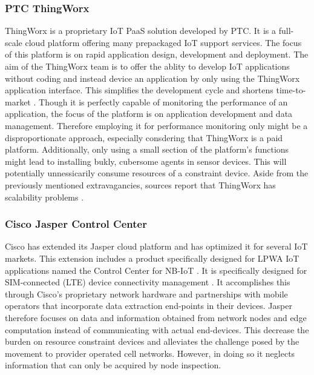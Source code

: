 \subsubsection*{PTC ThingWorx \cite{website:thingworx}}
ThingWorx is a proprietary IoT PaaS solution developed by PTC. It is a full-scale cloud platform offering many prepackaged IoT support services. The focus of this platform is on rapid application design, development and deployment. The aim of the ThingWorx team is to offer the ablity to develop IoT applications without coding and instead device an application by only using the ThingWorx application interface. This simplifies the development cycle and shortens time-to-market \cite{study_of_various}. Though it is perfectly capable of monitoring the performance of an application, the focus of the platform is on application development and data management. Therefore employing it for performance monitoring only might be a disproportionate approach, especially consdering that ThingWorx is a paid platform. Additionally, only using a small section of the platform's functions might lead to installing bukly, cubersome agents in sensor devices. This will potentially unnessicarily consume resources of a constraint device. Aside from the previously mentioned extravagancies, sources report that ThingWorx has scalability problems \cite{good_assessment}.%

\subsubsection*{Cisco Jasper Control Center \cite{cisco_jasper}}
Cisco has extended its Jasper cloud platform and has optimized it for several IoT markets. This extension includes a product specifically designed for LPWA IoT applications named the Control Center for NB-IoT \cite{cisco_jasper}. It is specifically designed for SIM-connected (LTE) device connectivity management \cite{forrester}. It accomplishes this through Cisco's proprietary network hardware and partnerships with mobile operators that incorporate data extraction end-points in their devices. Jasper therefore focuses on data and information obtained from network nodes and edge computation instead of communicating with actual end-devices. This decrease the burden on resource constraint devices and alleviates the challenge posed by the movement to provider operated cell networks. However, in doing so it neglects information that can only be acquired by node inspection. 

